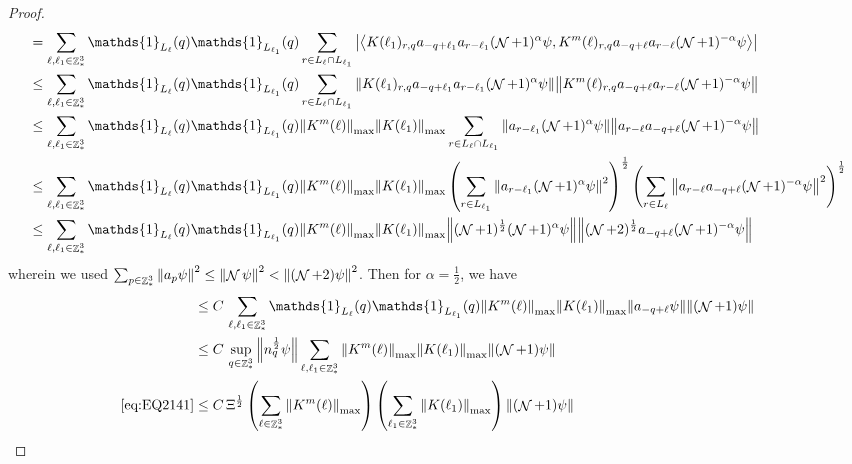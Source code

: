 \documentclass[sn-mathphys, Numbered ,a4paper]{sn-jnl}%
\DeclareMathOperator{\Z}{\mathbb{Z}}
\DeclareMathOperator{\NN}{\mathcal{N}}
\newcommand{\half}{\frac{1}{2}}
\newcommand{\eva}[1]{\left\langle #1 \right\rangle}
\theoremstyle{plain}
\theoremstyle{definition}
\theoremstyle{remark}
\theoremstyle{plain}
\theoremstyle{definition}
\theoremstyle{remark}
\begin{document}
\begin{proof}
\begin{align}
		&= \sum\limits_{\ell, \ell_1\in \Z^3_*} \mathds{1}_{L_{\ell}}(q) \mathds{1}_{L_{\ell_1}}(q) \sum\limits_{r\in L_{\ell} \cap L_{\ell_1}} \abs{\eva{ K(\ell_1)_{r,q} a_{-q+\ell_1} a_{r-\ell_1}(\NN+1)^{\alpha}\psi, K^m(\ell)_{r,q} a_{-q+\ell}a_{r-\ell} (\NN+1)^{-\alpha} \psi }}\nonumber\\
		&\leq \sum\limits_{\ell, \ell_1\in \Z^3_*} \mathds{1}_{L_{\ell}}(q) \mathds{1}_{L_{\ell_1}}(q) \sum\limits_{r\in L_{\ell} \cap L_{\ell_1}} \norm{ K(\ell_1)_{r,q} a_{-q+\ell_1} a_{r-\ell_1}(\NN+1)^{\alpha}\psi}\norm{ K^m(\ell)_{r,q} a_{-q+\ell}a_{r-\ell} (\NN+1)^{-\alpha} \psi }\nonumber\\
		&\leq \sum\limits_{\ell, \ell_1\in \Z^3_*} \mathds{1}_{L_{\ell}}(q) \mathds{1}_{L_{\ell_1}}(q)  \norm{K^m(\ell)}_{\mathrm{max}} \norm{ K(\ell_1)}_{\mathrm{max}}\sum\limits_{r\in L_{\ell} \cap L_{\ell_1}} \norm{ a_{r-\ell_1}(\NN+1)^{\alpha}\psi}\norm{ a_{r-\ell} a_{-q+\ell} (\NN+1)^{-\alpha} \psi }\nonumber\\
		&\leq \sum\limits_{\ell, \ell_1\in \Z^3_*} \mathds{1}_{L_{\ell}}(q) \mathds{1}_{L_{\ell_1}}(q)  \norm{K^m(\ell)}_{\mathrm{max}} \norm{ K(\ell_1)}_{\mathrm{max}}\left(\sum\limits_{r\in L_{\ell_1}} \norm{ a_{r-\ell_1} (\NN+1)^{\alpha} \psi}^2\right)^\half\left( \sum\limits_{r\in L_{\ell} } \norm{ a_{r-\ell} a_{-q+\ell} (\NN+1)^{-\alpha} \psi }^2\right)^\half\nonumber\\
		&\leq \sum\limits_{\ell, \ell_1\in \Z^3_*} \mathds{1}_{L_{\ell}}(q) \mathds{1}_{L_{\ell_1}}(q)  \norm{K^m(\ell)}_{\mathrm{max}} \norm{ K(\ell_1)}_{\mathrm{max}} \norm{ (\NN+1)^\half(\NN+1)^{\alpha} \psi} \norm{ (\NN+2)^\half a_{-q+\ell} (\NN+1)^{-\alpha} \psi }\nonumber
	\end{align} 
	wherein we used $\sum_{p\in \Z^3_*}\norm{a_p \psi}^2\leq\norm{\NN\psi}^2<\norm{(\NN+2)\psi}^2$. Then for $\alpha =  \half $, we have 
	\begin{align}
		&\leq C\,\sum\limits_{\ell, \ell_1\in \Z^3_*} \mathds{1}_{L_{\ell}}(q) \mathds{1}_{L_{\ell_1}}(q)  \norm{K^m(\ell)}_{\mathrm{max}} \norm{ K(\ell_1)}_{\mathrm{max}}  \norm{a_{-q+\ell} \psi } \norm{ (\NN+1) \psi} \nonumber\\
		&\leq C\, \sup\limits_{q\in \Z^3_*}\norm{n_q^\half \psi } \sum\limits_{\ell, \ell_1\in \Z^3_*}   \norm{K^m(\ell)}_{\mathrm{max}} \norm{ K(\ell_1)}_{\mathrm{max}}   \norm{ (\NN+1) \psi} \nonumber\\
		\eqref{eq:EQ2141}&\leq C\, \Xi^\half \left(\sum\limits_{\ell\in \Z^3_*} \norm{K^m(\ell)}_{\mathrm{max}}\right)\left(  \sum\limits_{ \ell_1\in \Z^3_*}  \norm{ K(\ell_1)}_{\mathrm{max}} \right) \norm{ (\NN+1) \psi}\label{eq:estEQ2141} 

\end{align}
\end{proof}
\end{document}
